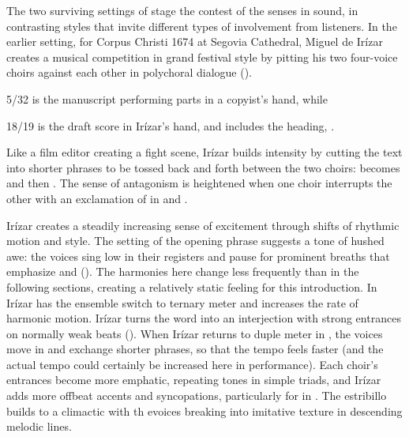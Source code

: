 The two surviving settings of  stage the contest of the senses in sound, in contrasting styles that invite different types of involvement from listeners.
In the earlier setting, for Corpus Christi 1674 at Segovia Cathedral, Miguel de Irízar creates a musical competition in grand festival style by pitting his two four-voice choirs against each other in polychoral dialogue ().%
  \begin{Footnote}
  \signature{E-SE}{5/32} is the manuscript performing parts in a copyist's hand, while \signature{E-SE}{18/19} is the draft score in Irízar's hand, and includes the heading, .
  \end{Footnote}
Like a film editor creating a fight scene, Irízar builds intensity by cutting the text into shorter phrases to be tossed back and forth between the two choirs:  becomes  and then . 
The sense of antagonism is heightened when one choir interrupts the other with an exclamation of  in  and .


Irízar creates a steadily increasing sense of excitement through shifts of rhythmic motion and style.
The setting of the opening phrase suggests a tone of hushed awe: the voices sing low in their registers and pause for prominent breaths that emphasize  and  ().
The harmonies here change less frequently than in the following sections, creating a relatively static feeling for this introduction.
In  Irízar has the ensemble switch to ternary meter and increases the rate of harmonic motion.
Irízar turns the word  into an interjection with strong entrances on normally weak beats ().
When Irízar returns to duple meter in , the voices move in  and exchange shorter phrases, so that the tempo feels faster (and the actual tempo could certainly be increased here in performance).
Each choir's entrances become more emphatic, repeating tones in simple triads, and Irízar adds more offbeat accents and syncopations, particularly for  in .
The estribillo builds to a climactic  with th evoices breaking into imitative texture in descending melodic lines.

